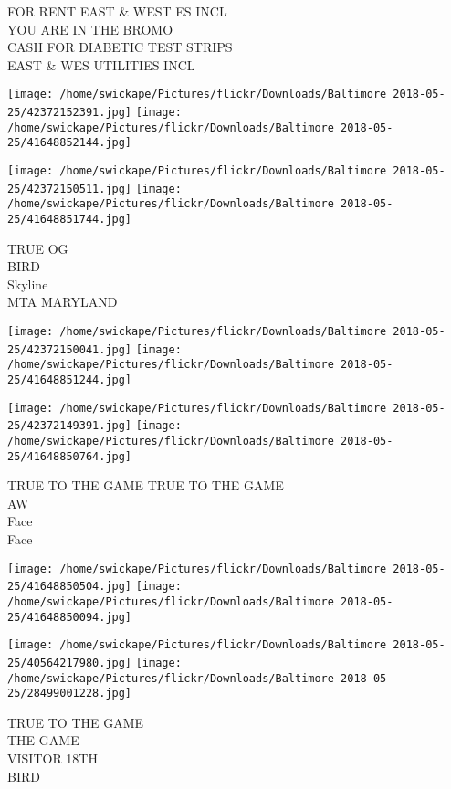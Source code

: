 \documentclass[10pt,letterpaper]{article}
\begin{document}
FOR RENT EAST \& WEST ES INCL\\
YOU ARE IN THE BROMO\\
CASH FOR DIABETIC TEST STRIPS\\
EAST \& WES UTILITIES INCL\\
\pagebreak

\texttt{[image: /home/swickape/Pictures/flickr/Downloads/Baltimore 2018-05-25/42372152391.jpg]}
\texttt{[image: /home/swickape/Pictures/flickr/Downloads/Baltimore 2018-05-25/41648852144.jpg]}

\texttt{[image: /home/swickape/Pictures/flickr/Downloads/Baltimore 2018-05-25/42372150511.jpg]}
\texttt{[image: /home/swickape/Pictures/flickr/Downloads/Baltimore 2018-05-25/41648851744.jpg]}

TRUE OG\\
BIRD\\
Skyline\\
MTA MARYLAND\\
\pagebreak

\texttt{[image: /home/swickape/Pictures/flickr/Downloads/Baltimore 2018-05-25/42372150041.jpg]}
\texttt{[image: /home/swickape/Pictures/flickr/Downloads/Baltimore 2018-05-25/41648851244.jpg]}

\texttt{[image: /home/swickape/Pictures/flickr/Downloads/Baltimore 2018-05-25/42372149391.jpg]}
\texttt{[image: /home/swickape/Pictures/flickr/Downloads/Baltimore 2018-05-25/41648850764.jpg]}

TRUE TO THE GAME TRUE TO THE GAME\\
AW\\
Face\\
Face\\
\pagebreak

\texttt{[image: /home/swickape/Pictures/flickr/Downloads/Baltimore 2018-05-25/41648850504.jpg]}
\texttt{[image: /home/swickape/Pictures/flickr/Downloads/Baltimore 2018-05-25/41648850094.jpg]}

\texttt{[image: /home/swickape/Pictures/flickr/Downloads/Baltimore 2018-05-25/40564217980.jpg]}
\texttt{[image: /home/swickape/Pictures/flickr/Downloads/Baltimore 2018-05-25/28499001228.jpg]}

TRUE TO THE GAME\\
THE GAME\\
VISITOR 18TH\\
BIRD\\
\pagebreak
\end{document}
